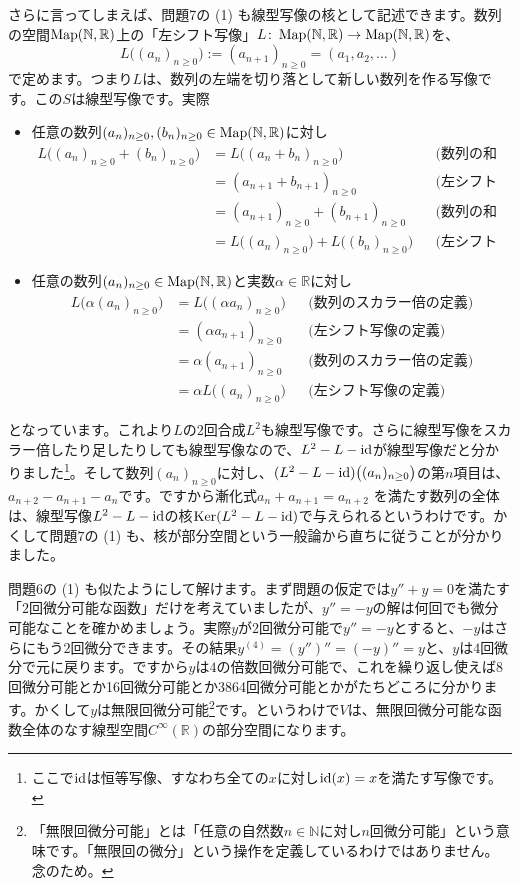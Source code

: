 さらに言ってしまえば、問題7の (1) も線型写像の核として記述できます。数列の空間$\operatorname{Map}(\mathbb{N}, \mathbb{R})$上の「左シフト写像」$L\colon \operatorname{Map}(\mathbb{N}, \mathbb{R})\rightarrow \operatorname{Map}(\mathbb{N}, \mathbb{R})$を、
\[
L\bigl((a_n)_{n\geq 0}\bigr) := (a_{n+1})_{n \geq 0} = (a_1, a_2, \ldots)
\]
で定めます。つまり$L$は、数列の左端を切り落として新しい数列を作る写像です。この$S$は線型写像です。実際
\begin{itemize}
\item 任意の数列$(a_n)_{n \geq 0}, (b_n)_{n \geq 0}\in\operatorname{Map}(\mathbb{N}, \mathbb{R})$に対し
\begin{align*}
L\bigl((a_n)_{n \geq 0} + (b_n)_{n \geq 0}\bigr)
&= L\bigl((a_n + b_n)_{n \geq 0}\bigr) & & \text{(数列の和の定義)} \\
&= (a_{n + 1} + b_{n + 1})_{n \geq 0} & & \text{(左シフト写像の定義)} \\
&= (a_{n + 1})_{n \geq 0} + (b_{n + 1})_{n \geq 0} & & \text{(数列の和の定義)} \\
&= L\bigl((a_n)_{n \geq 0}\bigr) + L\bigl((b_n)_{n \geq 0}\bigr) & & \text{(左シフト写像の定義)} 
\end{align*}
\item 任意の数列$(a_n)_{n \geq 0}\in\operatorname{Map}(\mathbb{N}, \mathbb{R})$と実数$\alpha\in\mathbb{R}$に対し
\begin{align*}
L\bigl(\alpha (a_n)_{n \geq 0}\bigr) 
&= L\bigl((\alpha a_n)_{n \geq 0}\bigr) & & \text{(数列のスカラー倍の定義)} \\
&= (\alpha a_{n+1})_{n \geq 0} & & \text{(左シフト写像の定義)} \\
&= \alpha (a_{n+1})_{n \geq 0} & & \text{(数列のスカラー倍の定義)} \\
&= \alpha L\bigl((a_n)_{n \geq 0}\bigr) & & \text{(左シフト写像の定義)}
\end{align*}
\end{itemize}
となっています。これより$L$の$2$回合成$L^2$も線型写像です。さらに線型写像をスカラー倍したり足したりしても線型写像なので、$L^2 - L - \operatorname{id}$が線型写像だと分かりました\footnote{ここで$\operatorname{id}$は恒等写像、すなわち全ての$x$に対し$\operatorname{id}(x) = x$を満たす写像です。}。そして数列$(a_n)_{n\geq 0}$に対し、$(L^2 - L -\operatorname{id})\bigl((a_n)_{n\geq 0}\bigr)$の第$n$項目は、$a_{n+2} - a_{n+1} - a_n$です。ですから漸化式$a_n + a_{n+1} = a_{n+2}$ を満たす数列の全体は、線型写像$L^2 - L - \operatorname{id}$の核$\operatorname{Ker} (L^2 - L - \operatorname{id})$で与えられるというわけです。かくして問題$7$の (1) も、核が部分空間という一般論から直ちに従うことが分かりました。

問題6の (1) も似たようにして解けます。まず問題の仮定では$y'' + y= 0$を満たす「$2$回微分可能な函数」だけを考えていましたが、$y'' = -y$の解は何回でも微分可能なことを確かめましょう。実際$y$が$2$回微分可能で$y'' = -y$とすると、$-y$はさらにもう$2$回微分できます。その結果$y^{(4)} = (y'')'' = (-y)'' = y$と、$y$は$4$回微分で元に戻ります。ですから$y$は$4$の倍数回微分可能で、これを繰り返し使えば8回微分可能とか16回微分可能とか3864回微分可能とかがたちどころに分かります。かくして$y$は無限回微分可能\footnote{「無限回微分可能」とは「任意の自然数$n\in\mathbb{N}$に対し$n$回微分可能」という意味です。「無限回の微分」という操作を定義しているわけではありません。念のため。}です。というわけで$V$は、無限回微分可能な函数全体のなす線型空間$C^{\infty}(\mathbb{R})$の部分空間になります。

